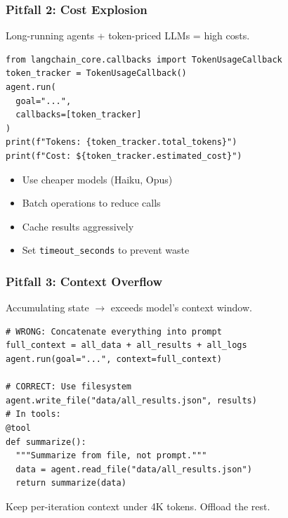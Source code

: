 \documentclass[aspectratio=169,11pt]{beamer}
\begin{document}
\begin{frame}[fragile]
\frametitle{Pitfall 2: Cost Explosion}

\begin{warningbox}
Long-running agents + token-priced LLMs = high costs.
\end{warningbox}

\begin{lstlisting}
from langchain_core.callbacks import TokenUsageCallback
token_tracker = TokenUsageCallback()
agent.run(
  goal="...",
  callbacks=[token_tracker]
)
print(f"Tokens: {token_tracker.total_tokens}")
print(f"Cost: ${token_tracker.estimated_cost}")
\end{lstlisting}

\begin{tipbox}
\begin{itemize}
    \setlength{\itemsep}{1pt}
  \item Use cheaper models (Haiku, Opus)
  \item Batch operations to reduce calls
  \item Cache results aggressively
  \item Set \texttt{timeout\_seconds} to prevent waste
\end{itemize}
\end{tipbox}

\end{frame}

\begin{frame}[fragile]
\frametitle{Pitfall 3: Context Overflow}

\begin{warningbox}
Accumulating state $\to$ exceeds model's context window.
\end{warningbox}

\begin{lstlisting}
# WRONG: Concatenate everything into prompt
full_context = all_data + all_results + all_logs
agent.run(goal="...", context=full_context)

# CORRECT: Use filesystem
agent.write_file("data/all_results.json", results)
# In tools:
@tool
def summarize():
  """Summarize from file, not prompt."""
  data = agent.read_file("data/all_results.json")
  return summarize(data)
\end{lstlisting}

\begin{tipbox}
Keep per-iteration context under 4K tokens. Offload the rest.
\end{tipbox}

\end{frame}
\end{document}

